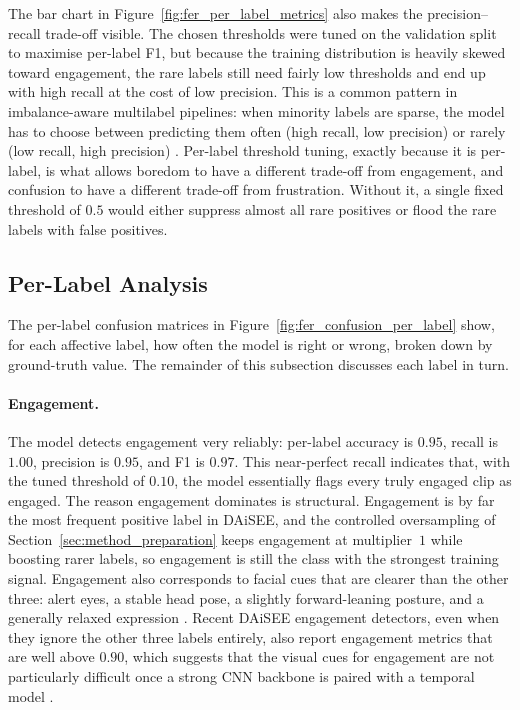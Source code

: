 The bar chart in Figure~\ref{fig:fer_per_label_metrics} also makes the precision--recall trade-off visible. The chosen thresholds were tuned on the validation split to maximise per-label F1, but because the training distribution is heavily skewed toward engagement, the rare labels still need fairly low thresholds and end up with high recall at the cost of low precision. This is a common pattern in imbalance-aware multilabel pipelines: when minority labels are sparse, the model has to choose between predicting them often (high recall, low precision) or rarely (low recall, high precision) \cite{santoni_convolutional_2023,rianto_engagement_2025}. Per-label threshold tuning, exactly because it is per-label, is what allows boredom to have a different trade-off from engagement, and confusion to have a different trade-off from frustration. Without it, a single fixed threshold of $0.5$ would either suppress almost all rare positives or flood the rare labels with false positives.

\subsection{Per-Label Analysis}\label{sec:results_fer_perlabel}

The per-label confusion matrices in Figure~\ref{fig:fer_confusion_per_label} show, for each affective label, how often the model is right or wrong, broken down by ground-truth value. The remainder of this subsection discusses each label in turn.

\paragraph{Engagement.} The model detects engagement very reliably: per-label accuracy is $0.95$, recall is $1.00$, precision is $0.95$, and F1 is $0.97$. This near-perfect recall indicates that, with the tuned threshold of $0.10$, the model essentially flags every truly engaged clip as engaged. The reason engagement dominates is structural. Engagement is by far the most frequent positive label in DAiSEE, and the controlled oversampling of Section~\ref{sec:method_preparation} keeps engagement at multiplier~$1$ while boosting rarer labels, so engagement is still the class with the strongest training signal. Engagement also corresponds to facial cues that are clearer than the other three: alert eyes, a stable head pose, a slightly forward-leaning posture, and a generally relaxed expression \cite{dmello_language_2012,asaju_adaptive_2022,asaju_affects_2021,tulsani_realtime_2025}. Recent DAiSEE engagement detectors, even when they ignore the other three labels entirely, also report engagement metrics that are well above $0.90$, which suggests that the visual cues for engagement are not particularly difficult once a strong CNN backbone is paired with a temporal model \cite{abedi_improving_2021,asaju_adaptive_2022,shiri_detection_2024,su_leveraging_2024,liu_dynamic_nodate}.

